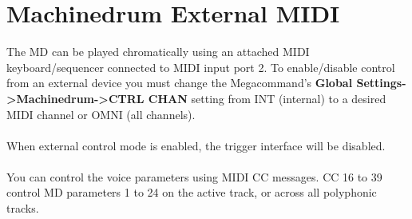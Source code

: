 \section{Machinedrum External MIDI}
The MD can be played chromatically using an attached MIDI keyboard/sequencer connected to MIDI input port 2.
To enable/disable control from an external device you must change the Megacommand's \textbf{Global Settings->Machinedrum->CTRL CHAN} setting from INT (internal) to a desired MIDI channel or OMNI (all channels).\\
\\
When external control mode is enabled, the trigger interface will be disabled.\\
\\
You can control the voice parameters using MIDI CC messages. CC 16 to 39 control MD parameters 1 to 24 on the active track, or across all polyphonic tracks.


